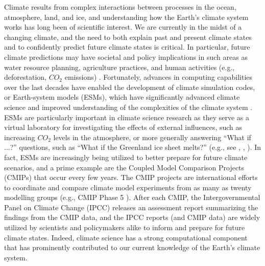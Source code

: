 Climate results from complex interactions between processes in the ocean, atmosphere, land, and ice, and understanding how the Earth's climate system works has long been of scientific interest.  We are currently in the midst of a changing climate, and the need to both explain past and present climate states and to confidently predict future climate states is critical.  In particular, future climate predictions may have societal and policy implications in such areas as water resource planning, agriculture practices, and human activities (e.g., deforestation, $CO_2$ emissions) \cite{washington2005}. Fortunately, advances in computing capabilities over the last decades have enabled the development of climate simulation codes, or Earth-system models (ESMs), which have significantly advanced climate science and improved understanding of the complexities of the climate system \cite{washington2009}.  ESMs are particularly important in climate science research as they serve as a virtual laboratory for investigating the effects of external influences, such as increasing $CO_2$ levels in the atmosphere, or more generally answering ``What if ...?'' questions, such as ``What if the Greenland ice sheet melts?'' (e.g., see \cite{heavens2013}, \cite{zeebe2011}, \cite{easterbrook2009}).  In fact, ESMs are increasingly being utilized to better prepare for future climate scenarios, and a prime example are the Coupled Model Comparison Projects (CMIPs) that occur every few years.  The CMIP projects 
are international efforts to coordinate and compare climate model experiments from as many as twenty modelling groups (e.g., CMIP Phase 5 \citep{cmip5}).  After each CMIP, the Intergovernmental Panel on Climate Change (IPCC) \cite{ipcc-web} releases an assessment report summarizing the findings from the CMIP data, and the IPCC reports (and CMIP data)
are widely utilized by scientists and policymakers alike to inform and prepare for future climate states. Indeed, climate science has a strong computational component that has prominently contributed to our current knowledge of the Earth's climate system.


